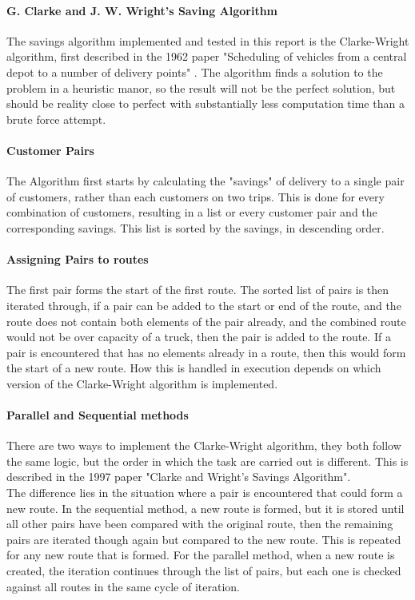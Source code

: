 \documentclass[conference]{acmsiggraph}
\begin{document}
\paragraph{G. Clarke and J. W. Wright's Saving Algorithm}
The savings algorithm implemented and tested in this report is the Clarke-Wright algorithm, first described in the 1962 paper "Scheduling of vehicles from a central depot to a number of delivery points" \cite{CW}.
The algorithm finds a solution to the problem in a heuristic manor, so the result will not be the perfect solution, but should be reality close to perfect with substantially less computation time than a brute force attempt. 

\paragraph{Customer Pairs}
The Algorithm first starts by calculating the "savings" of delivery to a single pair of customers, rather than each customers on two trips. This is done for every combination of customers, resulting in a list or every customer pair and the corresponding savings. This list is sorted by the savings, in descending order.

\paragraph{Assigning Pairs to routes}
The first pair forms the start of the first route. The sorted list of pairs is then iterated through, if a pair can be added to the start or end of the route, and the route does not contain both elements of the pair already, and the combined route would not be over capacity of a truck, then the pair is added to the route. If a pair is encountered that has no elements already in a route, then this would form the start of a new route. How this is handled in execution depends on which version of the Clarke-Wright algorithm is implemented.

\paragraph{Parallel and Sequential methods}
There are two ways to implement the Clarke-Wright algorithm, they both follow the same logic, but the order in which the task are carried out is different. This is described in the 1997 paper "Clarke and Wright's Savings Algorithm"\cite{CWj}.\\
The difference lies in the situation where a pair is encountered that could form a new route. In the sequential method, a new route is formed, but it is stored until all other pairs have been compared with the original route, then the remaining pairs are iterated though again but compared to the new route. This is repeated for any new route that is formed.
For the parallel method, when a new route is created, the iteration continues through the list of pairs, but each one is checked against all routes in the same cycle of iteration.
\end{document}
